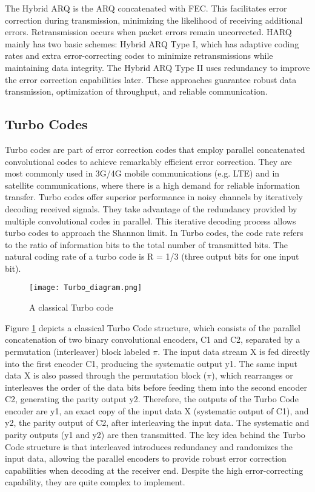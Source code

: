 \documentclass[sn-mathphys-num]{sn-jnl}
\theoremstyle{thmstyleone}
\theoremstyle{thmstyletwo}%
\theoremstyle{thmstylethree}%
\begin{document}
The Hybrid ARQ \cite{r1, r50} is the ARQ concatenated with FEC. This facilitates error correction during transmission, minimizing the likelihood of receiving additional errors. Retransmission occurs when packet errors remain uncorrected. HARQ mainly has two basic schemes: Hybrid ARQ Type I, which has adaptive coding rates and extra error-correcting codes to minimize retransmissions while maintaining data integrity. The Hybrid ARQ Type II uses redundancy to improve the error correction capabilities later. These approaches guarantee robust data transmission, optimization of throughput, and reliable communication.
 
\subsection{Turbo Codes}  \label{s1.3}

Turbo codes \cite{r22} are part of error correction codes that employ parallel concatenated convolutional codes to achieve remarkably efficient error correction. They are most commonly used in 3G/4G mobile communications (e.g. LTE) and in satellite communications, where there is a high demand for reliable information transfer. Turbo codes offer superior performance in noisy channels by iteratively decoding received signals. They take advantage of the redundancy provided by multiple convolutional codes in parallel. This iterative decoding process allows turbo codes to approach the Shannon limit. In Turbo codes, the code rate refers to the ratio of information bits to the total number of transmitted bits. The natural coding rate of a turbo code is R = 1/3 (three output bits for one input bit). 

\begin{figure}[H]
    \centering
    \texttt{[image: Turbo\_diagram.png]}
    \caption{A classical Turbo code \cite{r25}}
    \label{fig:12}
\end{figure}

Figure \ref{fig:12} depicts a classical Turbo Code structure, which consists of the parallel concatenation of two binary convolutional encoders, C1 and C2, separated by a permutation (interleaver) block labeled $\pi$. The input data stream X is fed directly into the first encoder C1, producing the systematic output y1. The same input data X is also passed through the permutation block ($\pi$), which rearranges or interleaves the order of the data bits before feeding them into the second encoder C2, generating the parity output y2. Therefore, the outputs of the Turbo Code encoder are y1, an exact copy of the input data X (systematic output of C1), and y2, the parity output of C2, after interleaving the input data. The systematic and parity outputs (y1 and y2) are then transmitted. The key idea behind the Turbo Code structure is that interleaved introduces redundancy and randomizes the input data, allowing the parallel encoders to provide robust error correction capabilities when decoding at the receiver end. Despite the high error-correcting capability, they are quite complex to implement.
\end{document}

